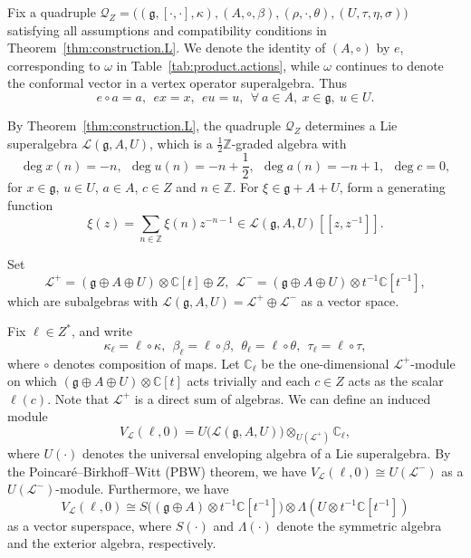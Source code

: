 \documentclass[12pt]{article}
\numberwithin{equation}{section}
\theoremstyle{definition}
\theoremstyle{plain}
\newcommand{\bC}{\ensuremath{\mathbb{C}}}
\newcommand{\bZ}{\ensuremath{\mathbb{Z}}}
\newcommand{\fg}{\mathfrak{g}}
\newcommand{\cQ}{\ensuremath{\mathcal{Q}}}
\newcommand{\cL}{\ensuremath{\mathcal{L}}}
\begin{document}
Fix a quadruple $\cQ_Z=\Big((\fg,[\cdot,\cdot],\kappa),(A,\circ,\beta),(\rho,\cdot,\theta),(U,\tau,\eta,\sigma)\Big)$ satisfying all assumptions and compatibility conditions in Theorem~\ref{thm:construction.L}. We denote the identity of $(A,\circ)$ by $e$, corresponding to $\omega$ in Table~\ref{tab:product.actions}, while 
$\omega$ continues to denote the conformal vector in a vertex operator superalgebra. Thus
\begin{equation}\label{unital.e}
    e\circ a=a,\ \ ex=x,\ \ eu=u,\ \ \forall\ a\in A,\ x\in\fg,\ u\in U.
\end{equation}

By Theorem~\ref{thm:construction.L}, the quadruple $\cQ_Z$ determines a Lie superalgebra $\cL(\fg,A,U)$, which is a $\frac{1}{2}\bZ$-graded algebra with
\begin{equation*}
    \deg x(n)=-n,\ \ \deg u(n)=-n+\frac{1}{2},\ \ \deg a(n)=-n+1,\ \ \deg c=0,
\end{equation*}
for $x\in\fg$, $u\in U$, $a\in A$, $c\in Z$ and $n\in\bZ$. For $\xi\in\fg+A+U$, form a generating function
\begin{equation*}
    \xi(z)=\sum_{n\in\bZ}\xi(n)z^{-n-1}\in\cL(\fg,A,U)[[z,z^{-1}]].
\end{equation*}

Set 
\begin{equation*}
    \cL^+=(\fg\oplus A\oplus U)\otimes\bC[t]\oplus Z,\ \ \cL^-=(\fg\oplus A\oplus U)\otimes t^{-1}\bC[t^{-1}],
\end{equation*}
which are subalgebras with $\cL(\fg,A,U)=\cL^+\oplus\cL^-$ as a vector space.

Fix $\ell\in Z^*$, and write
\begin{equation*}
    \kappa_\ell=\ell\circ\kappa,\ \ \beta_\ell=\ell\circ\beta,\ \ \theta_\ell=\ell\circ\theta,\ \ \tau_\ell=\ell\circ\tau,
\end{equation*}
where $\circ$ denotes composition of maps. Let $\bC_\ell$ be the one-dimensional $\cL^+$-module on which $(\fg\oplus A\oplus U)\otimes\bC[t]$ acts trivially and each $c\in Z$ acts as the scalar $\ell(c)$. Note that $\cL^+$ is a direct sum of algebras. We can define an induced module
\begin{equation*}
    V_\cL(\ell,0)=U\big(\cL(\fg,A,U)\big)\otimes_{U(\cL^+)}\bC_\ell,
\end{equation*}
where $U(\cdot)$ denotes the universal enveloping algebra of a Lie superalgebra. By the Poincar\'e--Birkhoff--Witt (PBW) theorem, we have $V_\cL(\ell,0)\cong U(\cL^-)$ as a $U(\cL^-)$-module. Furthermore, we have
\begin{equation*}
    V_\cL(\ell,0)\cong S\big((\fg\oplus A)\otimes t^{-1}\bC[t^{-1}]\big)\otimes \Lambda(U\otimes t^{-1}\bC[t^{-1}])
\end{equation*}
as a vector superspace, where $S(\cdot)$ and $\Lambda(\cdot)$ denote the symmetric algebra and the exterior algebra, respectively.
\end{document}
